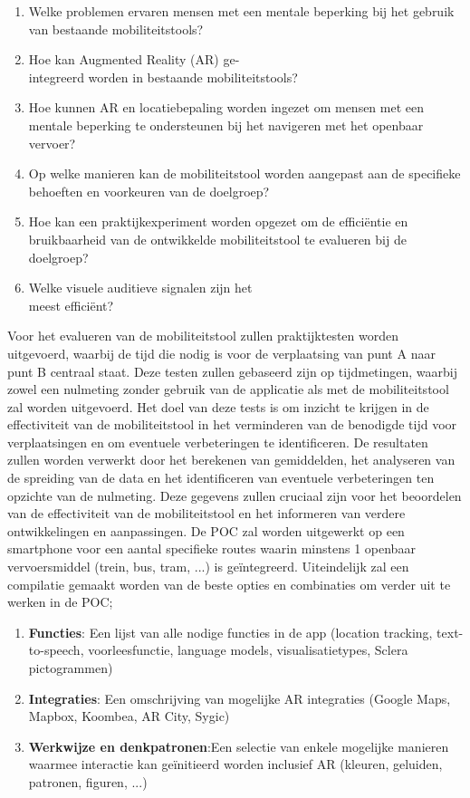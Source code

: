 \begin{enumerate}
    \item Welke problemen ervaren mensen met een mentale beperking bij het gebruik van bestaande mobiliteitstools?
    \item Hoe kan Augmented Reality (AR) ge-\\integreerd worden in bestaande mobiliteits\-tools?
    \item Hoe kunnen AR en locatiebepaling worden ingezet om mensen met een mentale beperking te ondersteunen bij het navigeren met het openbaar vervoer?
    \item Op welke manieren kan de mobiliteitstool worden aangepast aan de specifieke behoeften en voorkeuren van de doelgroep?
    \item Hoe kan een praktijkexperiment worden opgezet om de efficiëntie en bruikbaarheid van de ontwikkelde mobiliteitstool te evalueren bij de doelgroep?
    \item Welke visuele auditieve signalen zijn het \\meest efficiënt?
\end{enumerate}

Voor het evalueren van de mobiliteitstool zullen praktijktesten worden uitgevoerd, waarbij de tijd die nodig is voor de verplaatsing van punt A naar punt B centraal staat. 
Deze testen zullen gebaseerd zijn op tijdmetingen, waarbij zowel een nulmeting zonder gebruik van de applicatie als met de mobiliteitstool zal worden uitgevoerd. 
Het doel van deze tests is om inzicht te krijgen in de effectiviteit van de mobiliteitstool in het verminderen van de benodigde tijd voor verplaatsingen en om eventuele verbeteringen te identificeren. 
De resultaten zullen worden verwerkt door het berekenen van gemiddelden, het analyseren van de spreiding van de data en het identificeren van eventuele verbeteringen ten opzichte van de nulmeting. Deze gegevens zullen cruciaal zijn voor het beoordelen van de effectiviteit van de mobiliteitstool en het informeren van verdere ontwikkelingen en aanpassingen. De POC zal worden uitgewerkt op een smartphone voor een aantal specifieke routes waarin minstens 1 openbaar vervoersmiddel (trein, bus, tram, ...) is geïntegreerd. Uiteindelijk zal een compilatie gemaakt worden van de beste opties en combinaties om verder uit te werken in de POC; 

\begin{enumerate}
    \item \textbf{Functies}: Een lijst van alle nodige functies in de app (location tracking, text-to-speech, voorleesfunctie, language models, visualisatietypes, Sclera pictogrammen)
    \item \textbf{Integraties}: Een omschrijving van mogelijke AR integraties (Google Maps, Mapbox, Koombea, AR City, Sygic)
    \item \textbf{Werkwijze en denkpatronen}:Een selectie van enkele mogelijke manieren waarmee interactie kan geïnitieerd worden inclusief AR (kleuren, geluiden, patronen, figuren, ...)
\end{enumerate}


